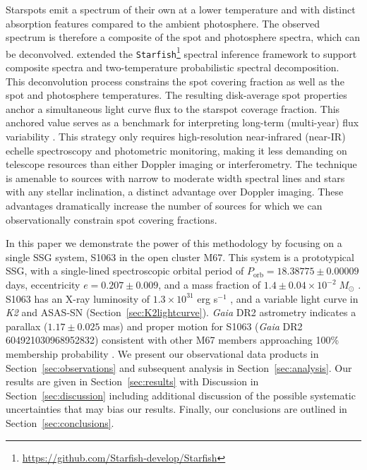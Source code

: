 \documentclass[twocolumn,tighten]{aastex631}
\begin{document}
Starspots emit a spectrum of their own at a lower temperature and with distinct absorption features compared to the ambient photosphere. The observed spectrum is therefore a composite of the spot and photosphere spectra, which can be deconvolved.  \citet{gullysantiago17} extended the \texttt{Starfish}\footnote{\url{https://github.com/Starfish-develop/Starfish}} \citep{czekala15} spectral inference framework to support composite spectra and two-temperature probabilistic spectral decomposition. This deconvolution process constrains the spot covering fraction as well as the spot and photosphere temperatures. The resulting disk-average spot properties anchor a simultaneous light curve flux to the starspot coverage fraction. This anchored value serves as a benchmark for interpreting long-term (multi-year) flux variability \citep{neff95}. This strategy only requires high-resolution near-infrared (near-IR) echelle spectroscopy and photometric monitoring, making it less demanding on telescope resources than either Doppler imaging or interferometry. The technique is amenable to sources with narrow to moderate width spectral lines and stars with any stellar inclination, a distinct advantage over Doppler imaging. These advantages dramatically increase the number of sources for which we can observationally constrain spot covering fractions.  

In this paper we demonstrate the power of this methodology by focusing on a single SSG system, S1063 \citep{1977A&AS...27...89S} in the open cluster M67. This system is a prototypical SSG, with a single-lined spectroscopic orbital period of $P_{\mathrm{orb}} = 18.38775\pm0.00009$ days, eccentricity $e = 0.207\pm0.009$, and a mass fraction of $1.4\pm0.04\times10^{-2}\;M_{\odot}$ \citep{geller2021}. S1063 has an X-ray luminosity of $1.3\times10^{31}$ erg s$^{-1}$ \citep{vandenberg99}, and a variable light curve in \textit{K2} and ASAS-SN (Section~\ref{sec:K2lightcurve}). \emph{Gaia} DR2 astrometry \citep{2016A&A...595A...1G, 2018A&A...616A...1G} indicates a parallax ($1.17\pm0.025 \;$mas) and proper motion for S1063 (\emph{Gaia} DR2 604921030968952832) consistent with other M67 members  approaching 100\% membership probability \citep{2018ApJ...869....9G}. We present our observational data products in Section~\ref{sec:observations} and subsequent analysis in Section~\ref{sec:analysis}. Our results are given in Section~\ref{sec:results} with Discussion in Section~\ref{sec:discussion} including additional discussion of the possible systematic uncertainties that may bias our results. Finally, our conclusions are outlined in Section~\ref{sec:conclusions}.
\end{document}
